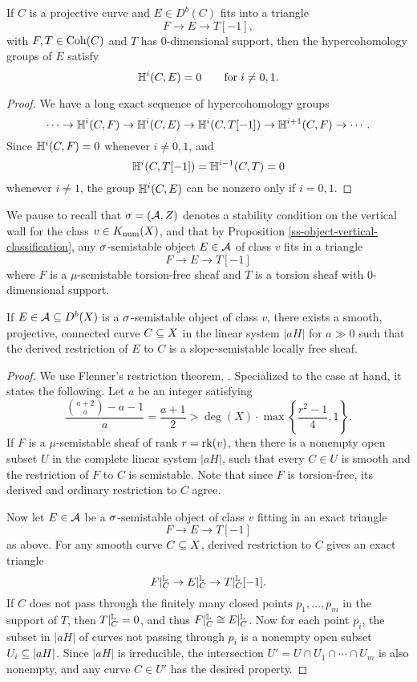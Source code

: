 \begin{lem}\label{hypercohovanishing}
    If $C$ is a projective curve and $E \in D^b(C)$ fits into a triangle
    \[ F \to E \to T[-1], \]
    with $F, T \in \operatorname{\mathrm{Coh}}(C)$ and $T$ has 0-dimensional support, then the hypercohomology groups of $E$ satisfy
    \[ \mathbb{H}^i(C, E) = 0 \qquad \mathrm{for} \; i \neq 0, 1. \]
\end{lem}
\begin{proof}
    We have a long exact sequence of hypercohomology groups
    \[ \cdots \to \mathbb{H}^i(C, F) \to \mathbb{H}^i(C, E) \to \mathbb{H}^i(C, T[-1]) \to \mathbb{H}^{i+1}(C, F) \to \cdots. \]
    Since $\mathbb{H}^i(C, F) = 0$ whenever $i \neq 0, 1$, and 
    \[ \mathbb{H}^i(C, T[-1]) = \mathbb{H}^{i-1}(C, T) = 0 \] 
    whenever $i \neq 1$, the group $\mathbb{H}^i(C, E)$ can be nonzero only if $i = 0,1$.
\end{proof}

We pause to recall that $\sigma = (\mathcal{A}, Z)$ denotes a stability condition on the vertical wall for the class $v \in K_{\mathrm{num}}(X)$, and that by Proposition \ref{ss-object-vertical-classification}, any $\sigma$-semistable object $E \in \mathcal{A}$ of class $v$ fits in a triangle
\[ F \to E \to T[-1] \]
where $F$ is a $\mu$-semistable torsion-free sheaf and $T$ is a torsion sheaf with 0-dimensional support. 

\begin{lem}\label{restsemistable}
    If $E \in \mathcal{A} \subseteq D^b(X)$ is a $\sigma$-semistable object of class $v$, there exists a smooth, projective, connected curve $C \subseteq X$ in the linear system $|a H|$ for $a \gg 0$ such that the derived restriction of $E$ to $C$ is a slope-semistable locally free sheaf.    
\end{lem}
\begin{proof} 
We use Flenner's restriction theorem, \cite[Theorem 7.1.1]{HL}. Specialized to the case at hand, it states the following. Let $a$ be an integer satisfying
\[ \frac{\binom{a+2}{a} - a - 1}{a} = \frac{a+1}{2} > \deg(X) \cdot \max\left\{\frac{r^2 - 1}{4}, 1\right\}. \]
If $F$ is a $\mu$-semistable sheaf of rank $r = \operatorname{\mathrm{rk}}(v)$, then there is a nonempty open subset $U$ in the complete linear system $|aH|$, such that every $C \in U$ is smooth and the restriction of $F$ to $C$ is semistable. Note that since $F$ is torsion-free, its derived and ordinary restriction to $C$ agree.

Now let $E \in \mathcal{A}$ be a $\sigma$-semistable object of class $v$ fitting in an exact triangle
\[ F \to E \to T[-1] \]
as above. For any smooth curve $C \subseteq X$, derived restriction to $C$ gives an exact triangle
\[ F|_C^{\mathbb{L}} \to E|_C^{\mathbb{L}} \to T|_C^{\mathbb{L}}[-1]. \]
If $C$ does not pass through the finitely many closed points $p_1,\ldots,p_m$ in the support of $T$, then $T|_C^{\mathbb{L}} = 0$, and thus $F|_C^{\mathbb{L}} \cong E|_C^{\mathbb{L}}$. Now for each point $p_i$, the subset in $|a H|$ of curves not passing through $p_i$ is a nonempty open subset $U_i \subseteq |a H|$. Since $|a H|$ is irreducible, the intersection $U' = U \cap U_1 \cap \cdots \cap U_m$ is also nonempty, and any curve $C \in U'$ has the desired property. 
\end{proof}

